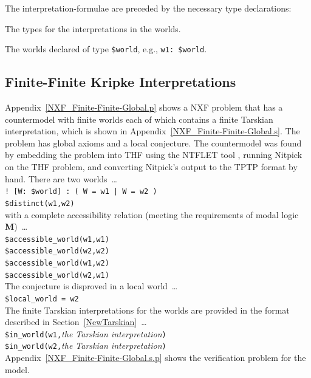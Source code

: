 \documentclass{easychair}
\newcommand{\smalltt}[1]{\small \texttt{#1}}
\newenvironment{packed_itemize}{
\vspace*{-0.3em}
\begin{itemize}
\setlength{\partopsep}{0pt}
\setlength{\itemsep}{1pt}
\setlength{\parskip}{0pt}
\setlength{\parsep}{0pt}
}{\end{itemize}}
\begin{document}
\vspace*{0.5em}
The interpretation-formulae are preceded by the necessary type declarations:
\begin{packed_itemize}
\item The types for the interpretations in the worlds.
\item The worlds declared of type {\tt \$world}, e.g., {\tt w1: \$world}.
\end{packed_itemize}

\subsection{Finite-Finite Kripke Interpretations}
\label{NewKripkeFiniteFinite}

Appendix~\ref{NXF_Finite-Finite-Global.p} shows a NXF problem that has a countermodel with
finite worlds each of which contains a finite Tarskian interpretation, which is shown in
Appendix~\ref{NXF_Finite-Finite-Global.s}.
The problem has global axioms and a local conjecture.
The countermodel was found by embedding the problem into THF using the NTFLET tool 
\cite{Ste22,Ste22-LE}, running Nitpick on the THF problem, and converting Nitpick's output
to the TPTP format by hand.
There are two worlds~\ldots \\
\hspace*{0.5cm}\smalltt{! [W: \$world] : ( W = w1 | W = w2 )} \\
\hspace*{0.5cm}\smalltt{\$distinct(w1,w2)} \\
with a complete accessibility relation (meeting the requirements of modal logic 
\textbf{M})~\ldots \\
\hspace*{0.5cm}\smalltt{\$accessible\_world(w1,w1)} \\
\hspace*{0.5cm}\smalltt{\$accessible\_world(w2,w2)} \\
\hspace*{0.5cm}\smalltt{\$accessible\_world(w1,w2)} \\
\hspace*{0.5cm}\smalltt{\$accessible\_world(w2,w1)} \\
The conjecture is disproved in a local world~\ldots \\
\hspace*{0.5cm}\smalltt{\$local\_world = w2} \\
The finite Tarskian interpretations for the worlds are provided in the format described in 
Section~\ref{NewTarskian}~\ldots \\
\hspace*{0.5cm}\smalltt{\$in\_world(w1,}\emph{the Tarskian interpretation}{\tt )} \\
\hspace*{0.5cm}\smalltt{\$in\_world(w2,}\emph{the Tarskian interpretation}{\tt )} \\
Appendix~\ref{NXF_Finite-Finite-Global.s.p} shows the verification problem for the model.
\end{document}
